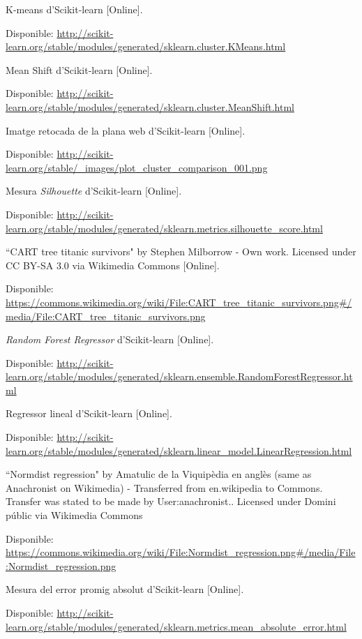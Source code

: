 \documentclass[12pt,a4paper,catalan]{article}
\begin{document}
\begin{thebibliography}{9}
K-means d'Scikit-learn [Online].

Disponible: \url{http://scikit-learn.org/stable/modules/generated/sklearn.cluster.KMeans.html}


Mean Shift d'Scikit-learn [Online].

Disponible: \url{http://scikit-learn.org/stable/modules/generated/sklearn.cluster.MeanShift.html}


Imatge retocada de la plana web d'Scikit-learn [Online].

Disponible: \url{http://scikit-learn.org/stable/_images/plot_cluster_comparison_001.png}


Mesura \textit{Silhouette} d'Scikit-learn [Online].

Disponible: \url{http://scikit-learn.org/stable/modules/generated/sklearn.metrics.silhouette_score.html}


``CART tree titanic survivors" by Stephen Milborrow - Own work. Licensed under CC BY-SA 3.0 via Wikimedia Commons [Online].

Disponible: \url{https://commons.wikimedia.org/wiki/File:CART_tree_titanic_survivors.png#/media/File:CART_tree_titanic_survivors.png}


\textit{Random Forest Regressor} d'Scikit-learn [Online].

Disponible: \url{http://scikit-learn.org/stable/modules/generated/sklearn.ensemble.RandomForestRegressor.html}


Regressor lineal d'Scikit-learn [Online].

Disponible: \url{http://scikit-learn.org/stable/modules/generated/sklearn.linear_model.LinearRegression.html}


``Normdist regression" by Amatulic de la Viquipèdia en anglès (same as Anachronist on Wikimedia) - Transferred from en.wikipedia to Commons. Transfer was stated to be made by User:anachronist.. Licensed under Domini públic via Wikimedia Commons

Disponible: \url{https://commons.wikimedia.org/wiki/File:Normdist_regression.png#/media/File:Normdist_regression.png}


Mesura del error promig absolut d'Scikit-learn [Online].

Disponible: \url{http://scikit-learn.org/stable/modules/generated/sklearn.metrics.mean_absolute_error.html}



\end{thebibliography}
\end{document}
